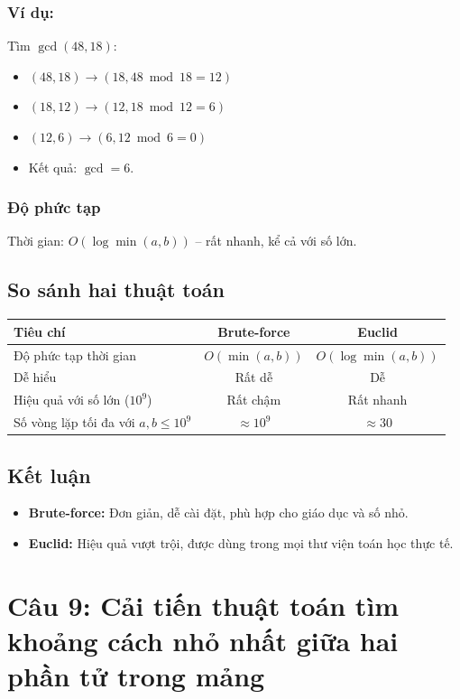 \documentclass[12pt,a4paper]{article}
\begin{document}
\subsubsection*{Ví dụ:}
Tìm $\gcd(48, 18)$:
\begin{itemize}
    \item $(48,18) \rightarrow (18, 48 \bmod 18 = 12)$
    \item $(18,12) \rightarrow (12, 18 \bmod 12 = 6)$
    \item $(12,6) \rightarrow (6, 12 \bmod 6 = 0)$
    \item Kết quả: $\gcd = 6$.
\end{itemize}

\subsubsection*{Độ phức tạp}
Thời gian: $O(\log \min(a,b))$ – rất nhanh, kể cả với số lớn.

\subsection*{So sánh hai thuật toán}

\begin{tabular}{|l|c|c|}
\hline
\textbf{Tiêu chí} & \textbf{Brute-force} & \textbf{Euclid} \\
\hline
Độ phức tạp thời gian & $O(\min(a,b))$ & $O(\log \min(a,b))$ \\
\hline
Dễ hiểu & Rất dễ & Dễ \\
\hline
Hiệu quả với số lớn ($10^9$) & Rất chậm & Rất nhanh \\
\hline
Số vòng lặp tối đa với $a,b \le 10^9$ & $\approx 10^9$ & $\approx 30$ \\
\hline
\end{tabular}

\subsection*{Kết luận}
\begin{itemize}
    \item \textbf{Brute-force:} Đơn giản, dễ cài đặt, phù hợp cho giáo dục và số nhỏ.
    \item \textbf{Euclid:} Hiệu quả vượt trội, được dùng trong mọi thư viện toán học thực tế.
\end{itemize}



\section*{Câu 9: Cải tiến thuật toán tìm khoảng cách nhỏ nhất giữa hai phần tử trong mảng}
\end{document}
